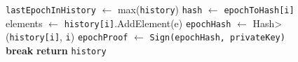 \begin{figure}[t!]
\begin{adjustbox}{minipage=[t]{\columnwidth}}
\begin{algorithm}[H]
\begin{algorithmic}[1]
            		\State \texttt{lastEpochInHistory} $\leftarrow$ max(\texttt{history})
            			\State \texttt{hash} $\leftarrow$  \texttt{epochToHash[i]}
                			\State elements $\leftarrow$ 
                					\State \texttt{history[i]}.AddElement(e)
                    	 		\EndIf
                    	 	\EndFor
                    	    \State \texttt{epochHash} $\leftarrow$ \<Hash>(\texttt{history[i]}, \texttt{i})
                			\State \texttt{epochProof} $\leftarrow$  \texttt{Sign(\texttt{epochHash}, privateKey)}
               			\State {}
               		 \Else
               		 	\State \textbf{break}
                    	\EndIf
                	\EndFor
            		\State \textbf{return} \texttt{history}
            	\EndFunction

        \end{algorithmic}
      \end{algorithm}
	\end{adjustbox}
  \end{figure}
  
